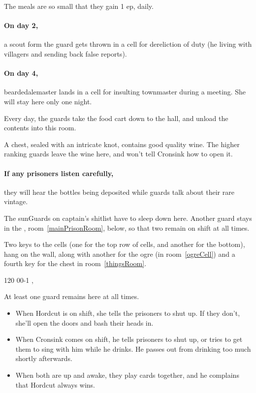 \begin{multicols}{2}
The meals are so small that they gain 1 \gls{ep}, daily.

\paragraph{On day 2,}
a scout form the \gls{guard} gets thrown in a cell for dereliction of duty (he living with villagers and sending back false reports).

\paragraph{On day 4,}
\gls{beardedalemaster} lands in a cell for insulting \gls{townmaster} during a meeting.
She will stay here only one night.


Every day, the guards take the food cart down to the hall, and unload the contents into this room.

A chest, sealed with an intricate knot, contains good quality wine.
The higher ranking guards leave the wine here, and won't tell Cronsink how to open it.

\paragraph{If any prisoners listen carefully,}
they will hear the bottles being deposited while guards talk about their rare vintage.


The \glspl{sunGuard} on \gls{captain}'s shitlist have to sleep down here.
Another guard stays in the , room~\ref{mainPrisonRoom}, below, so that two remain on shift at all times.

Two keys to the cells (one for the top row of cells, and another for the bottom), hang on the wall, along with another for the ogre (in room~\ref{ogreCell}) and a fourth key for the chest in room~\ref{thingsRoom}.

%
  {{1}{2}{0}}%
  {{0}{0}{-1}}%
  {%
    \shortsword
    \partialplate
  }%
  {\brawler, \berserker}%
  {\lootSmall}%
  {}%


At least one guard remains here at all times.
\begin{itemize}
  \item
  When Hordcut is on shift, she tells the prisoners to shut up.
  If they don't, she'll open the doors and bash their heads in.
  \item
  When Cronsink comes on shift, he tells prisoners to shut up, or tries to get them to sing with him while he drinks.
  He passes out from drinking too much shortly afterwards.
  \item
  When both are up and awake, they play cards together, and he complains that Hordcut always wins.
\end{itemize}


\end{multicols}
